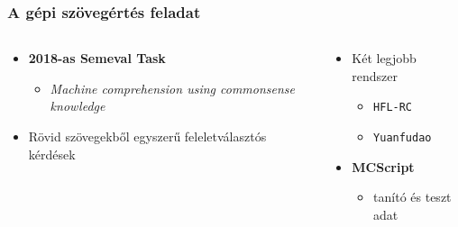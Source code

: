 \documentclass[bigger]{beamer}
\begin{document}
\begin{frame}
	\frametitle{A gépi szövegértés feladat \citep{Chen:2018, Wang:2018}}
	\begin{columns}
		\begin{column}{0.6\textwidth}
			\begin{itemize}
				\pause \item \textbf{2018-as Semeval Task}
				\begin{itemize}
					\item \textit{Machine comprehension using commonsense knowledge}
				\end{itemize}
				\pause \item Rövid szövegekből egyszerű feleletválasztós kérdések
			\end{itemize}
		\end{column}
		\begin{column}{0.5\textwidth}
			\begin{itemize}
				\pause \item Két legjobb rendszer
				\begin{itemize}
					\item \texttt{HFL-RC}
					\item \texttt{Yuanfudao}
				\end{itemize}
				\pause \item \textbf{MCScript}
				\begin{itemize}
					\item tanító és teszt adat
				\end{itemize}
			\end{itemize}
		\end{column}
	\end{columns}
	
\end{frame}
\end{document}
